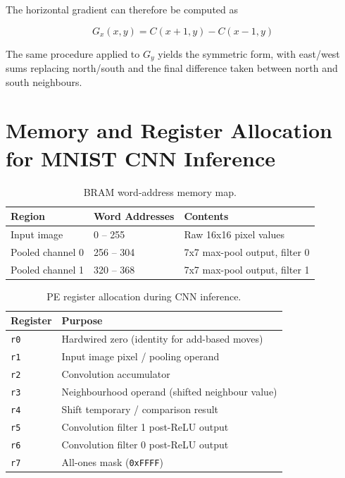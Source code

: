 \begin{uomappendix}
    The horizontal gradient can therefore be computed as
    
    \begin{equation}
    G_x(x,y)=C(x+1,y)-C(x-1,y)
    \label{eq:sobel_gx}
    \end{equation}
    
    The same procedure applied to $G_y$ yields the symmetric form, with 
    east/west sums replacing north/south and the final difference taken 
    between north and south neighbours.

    \section{Memory and Register Allocation for MNIST CNN Inference} \label{sec:memregalloc}


    \begin{table}[H]
        \centering
        \caption{BRAM word-address memory map.}
        \label{tab:bram_map}
        \begin{tabular}{lll}
        \hline
        \textbf{Region} & \textbf{Word Addresses} & \textbf{Contents} \\
        \hline
        Input image     & 0 -- 255      & Raw 16x16 pixel values \\
        Pooled channel 0 & 256 -- 304   & 7x7 max-pool output, filter 0 \\
        Pooled channel 1 & 320 -- 368   & 7x7 max-pool output, filter 1 \\
        \hline
        \end{tabular}
    \end{table}
        

    
    \begin{table}[H]
        \centering
        \caption{PE register allocation during CNN inference.}
        \label{tab:reg_alloc}
        \begin{tabular}{ll}
        \hline
        \textbf{Register} & \textbf{Purpose} \\
        \hline
        \texttt{r0} & Hardwired zero (identity for add-based moves) \\
        \texttt{r1} & Input image pixel / pooling operand \\
        \texttt{r2} & Convolution accumulator \\
        \texttt{r3} & Neighbourhood operand (shifted neighbour value) \\
        \texttt{r4} & Shift temporary / comparison result \\
        \texttt{r5} & Convolution filter 1 post-ReLU output \\
        \texttt{r6} & Convolution filter 0 post-ReLU output \\
        \texttt{r7} & All-ones mask (\texttt{0xFFFF}) \\
        \hline
        \end{tabular}
    \end{table}

    
\end{uomappendix}


